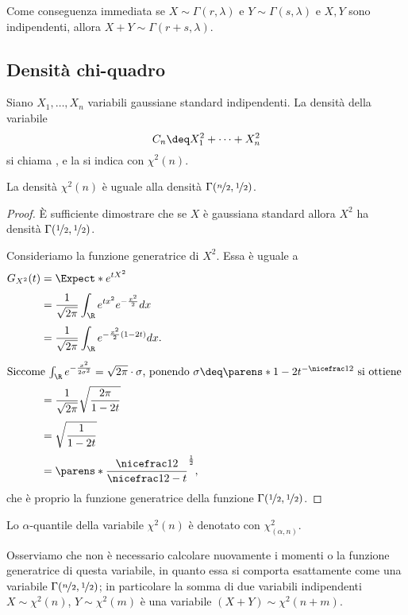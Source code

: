 Come conseguenza immediata se $X \sim \Gamma(r, \lambda)$ e $Y \sim \Gamma(s, \lambda)$ e $X, Y$ sono indipendenti, allora $X + Y \sim \Gamma(r + s, \lambda)$.

\subsection{Densità chi-quadro}

\begin{definition}
    Siano $X_1, \dots, X_n$ variabili gaussiane standard indipendenti. La densità della variabile \[
        C_n \deq X_1^2 + \dots + X_n^2    
    \] si chiama , e la si indica con $\chi^2(n)$.
\end{definition}

\begin{proposition}
    La densità $\chi^2(n)$ è uguale alla densità $\Gamma(\nicefrac{n}{2}, \nicefrac{1}{2})$.
\end{proposition}
\begin{proof}
    È sufficiente dimostrare che se $X$ è gaussiana standard allora $X^2$ ha densità $\Gamma(\nicefrac{1}{2}, \nicefrac{1}{2})$.

    Consideriamo la funzione generatrice di $X^2$. Essa è uguale a \begin{align*}
        G_{X^2}(t) &= \Expect*{e^{tX^2}}\\[3pt]
        &= \frac{1}{\sqrt{2\pi}} \int_{\R} e^{tx^2}e^{-\frac{x^2}{2}} dx\\[3pt]
        &= \frac{1}{\sqrt{2\pi}} \int_{\R} e^{-\frac{x^2}{2}(1 - 2t)} dx.\\[3pt]
        \intertext{Siccome $\int_{\R} e^{-\frac{x^2}{2\sigma^2}} = \sqrt{2\pi} \cdot \sigma$, ponendo $\sigma \deq \parens*{1 - 2t}^{-\nicefrac12}$ si ottiene }
        &= \frac{1}{\sqrt{2\pi}} \sqrt{\frac{2\pi}{1-2t}}\\[3pt]
        &= \sqrt{\frac{1}{1-2t}}\\[3pt]
        &= \parens*{\frac{\nicefrac12}{\nicefrac12 - t}}^\frac12,
    \end{align*} che è proprio la funzione generatrice della funzione $\Gamma(\nicefrac{1}{2}, \nicefrac12)$.
\end{proof}

Lo $\alpha$-quantile della variabile $\chi^2(n)$ è denotato con $\chi^2_{(\alpha, n)}$.

Osserviamo che non è necessario calcolare nuovamente i momenti o la funzione generatrice di questa variabile, in quanto essa si comporta esattamente come una variabile $\Gamma(\nicefrac{n}{2}, \nicefrac12)$; in particolare la somma di due variabili indipendenti $X \sim \chi^2(n)$, $Y \sim \chi^2(m)$ è una variabile $(X + Y) \sim \chi^2(n + m)$.

